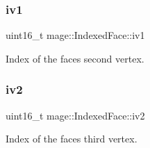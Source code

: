 \subsubsection{\texorpdfstring{iv1}{iv1}}
{\footnotesize\ttfamily uint16\+\_\+t mage\+::\+Indexed\+Face\+::iv1}

Index of the face\textquotesingle{}s second vertex. \hypertarget{structmage_1_1_indexed_face_ae0e96f9c46f47c7d02da18eb04f497ff}{}\label{structmage_1_1_indexed_face_ae0e96f9c46f47c7d02da18eb04f497ff} 
\subsubsection{\texorpdfstring{iv2}{iv2}}
{\footnotesize\ttfamily uint16\+\_\+t mage\+::\+Indexed\+Face\+::iv2}

Index of the face\textquotesingle{}s third vertex. 
